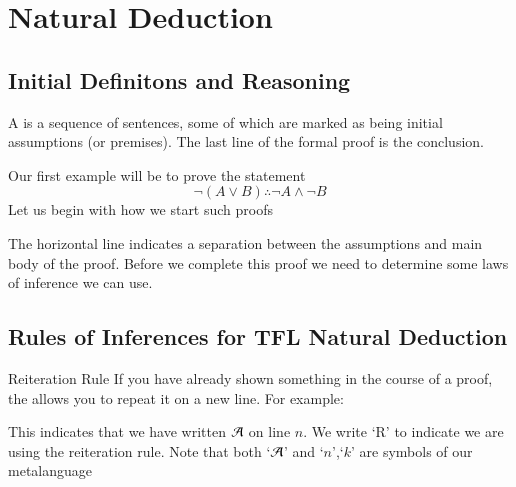 \documentclass[12pt, a4paper, twoside, openright, titlepage]{book}
\begin{document}
\chapter{\textsection\textsection Natural Deduction}

\section{\textsection Initial Definitons and Reasoning}

\begin{defn}{}{}
    A  is a sequence of sentences, some of which are marked as being initial assumptions (or premises). The last line of the formal proof is the conclusion.
\end{defn}

\begin{eg}{}{}
    Our first example will be to prove the statement \begin{equation*}
        \lnot(A\lor B)\therefore \lnot A \wedge \lnot B
    \end{equation*}
    Let us begin with how we start such proofs\begin{fitchproof}
	\end{fitchproof}
    The horizontal line indicates a separation between the assumptions and main body of the proof. Before we complete this proof we need to determine some laws of inference we can use.
\end{eg}

\section{\textsection Rules of Inferences for TFL Natural Deduction}

\begin{defn}{Reiteration Rule}{}
    If you have already shown something in the course of a proof, the  allows you to repeat it on a new line. For example: 
    \begin{fitchproof}
        \have[$\vdots$]{}{\vdots}
         
    \end{fitchproof}
    This indicates that we have written $\mathcal{A}$ on line $n$. We write `R' to indicate we are using the reiteration rule. Note that both `$\mathcal{A}$' and `$n$',`$k$' are symbols of our metalanguage
\end{defn}
\end{document}
